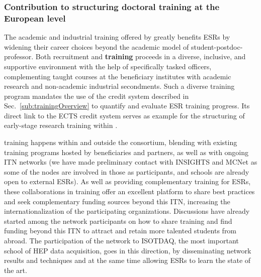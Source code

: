 
\subsubsection*{Contribution to structuring doctoral training at the European level}


The academic and industrial training offered by \acronym
greatly benefits ESRs by widening their career choices
beyond the academic model of student-postdoc-professor.
Both \acronym recruitment and \textbf{training} proceeds in a diverse, inclusive, and
supportive environment with the help of specifically tasked officers, complementing
taught courses at the beneficiary institutes with academic research and 
non-academic industrial secondments. 
Such a diverse training program mandates the use of the credit system
described in Sec.~\ref{sub:trainingOverview} to quantify and
evaluate ESR training progress. %
Its direct link to the ECTS credit system serves as example for the 
structuring of early-stage research training within \acronym. 

\acronym training happens within and outside the consortium, 
blending with existing training programs hosted by beneficiaries and partners, as well 
as with ongoing ITN networks (we have made preliminary contact with INSIGHTS and MCNet as some of the nodes are involved
in those as participants, and schools are already open to external ESRs).
As well as providing complementary training for ESRs, 
these collaborations in training offer an excellent platform to share best practices and seek complementary 
funding sources beyond this ITN, increasing the internationalization
of the participating organizations. Discussions have already started among the network participants
on how to share training and find funding beyond this ITN 
to attract and retain more talented students from abroad. The participation of the network
to ISOTDAQ, the most important school of HEP data acquisition, goes in this direction, by 
disseminating network results and techniques and at the same time allowing ESRs to learn the state of the art. 

